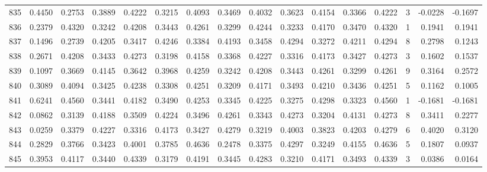 \begin{tabular}{lrrrrrrrrrrrrrrr}
835 &      0.4450 &  0.2753 &  0.3889 &  0.4222 &  0.3215 &  0.4093 &  0.3469 &  0.4032 &  0.3623 &  0.4154 &   0.3366 &     0.4222 &      3 &                   -0.0228 &                    -0.1697 \\
836 &      0.2379 &  0.4320 &  0.3242 &  0.4208 &  0.3443 &  0.4261 &  0.3299 &  0.4244 &  0.3233 &  0.4170 &   0.3470 &     0.4320 &      1 &                    0.1941 &                     0.1941 \\
837 &      0.1496 &  0.2739 &  0.4205 &  0.3417 &  0.4246 &  0.3384 &  0.4193 &  0.3458 &  0.4294 &  0.3272 &   0.4211 &     0.4294 &      8 &                    0.2798 &                     0.1243 \\
838 &      0.2671 &  0.4208 &  0.3433 &  0.4273 &  0.3198 &  0.4158 &  0.3368 &  0.4227 &  0.3316 &  0.4173 &   0.3427 &     0.4273 &      3 &                    0.1602 &                     0.1537 \\
839 &      0.1097 &  0.3669 &  0.4145 &  0.3642 &  0.3968 &  0.4259 &  0.3242 &  0.4208 &  0.3443 &  0.4261 &   0.3299 &     0.4261 &      9 &                    0.3164 &                     0.2572 \\
840 &      0.3089 &  0.4094 &  0.3425 &  0.4238 &  0.3308 &  0.4251 &  0.3209 &  0.4171 &  0.3493 &  0.4210 &   0.3436 &     0.4251 &      5 &                    0.1162 &                     0.1005 \\
841 &      0.6241 &  0.4560 &  0.3441 &  0.4182 &  0.3490 &  0.4253 &  0.3345 &  0.4225 &  0.3275 &  0.4298 &   0.3323 &     0.4560 &      1 &                   -0.1681 &                    -0.1681 \\
842 &      0.0862 &  0.3139 &  0.4188 &  0.3509 &  0.4224 &  0.3496 &  0.4261 &  0.3343 &  0.4273 &  0.3204 &   0.4131 &     0.4273 &      8 &                    0.3411 &                     0.2277 \\
843 &      0.0259 &  0.3379 &  0.4227 &  0.3316 &  0.4173 &  0.3427 &  0.4279 &  0.3219 &  0.4003 &  0.3823 &   0.4203 &     0.4279 &      6 &                    0.4020 &                     0.3120 \\
844 &      0.2829 &  0.3766 &  0.3423 &  0.4001 &  0.3785 &  0.4636 &  0.2478 &  0.3375 &  0.4297 &  0.3249 &   0.4155 &     0.4636 &      5 &                    0.1807 &                     0.0937 \\
845 &      0.3953 &  0.4117 &  0.3440 &  0.4339 &  0.3179 &  0.4191 &  0.3445 &  0.4283 &  0.3210 &  0.4171 &   0.3493 &     0.4339 &      3 &                    0.0386 &                     0.0164 \\

\end{tabular}
